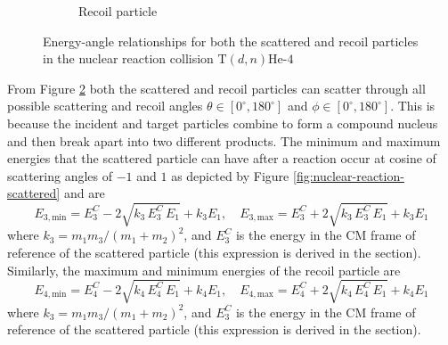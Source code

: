 \documentclass[../main.tex]{subfiles}
\begin{document}
\begin{figure}[!htb]
\begin{subfigure}{.5\textwidth}
    \caption{Recoil particle}
    \label{fig:nuclear-reaction-recoil}
  \end{subfigure}
  \caption{Energy-angle relationships for both the scattered and recoil particles in the nuclear reaction collision $\text{T}(d,n)\text{He-4}$}
  \label{fig:nuclear-reaction}
\end{figure}

From Figure \ref{fig:nuclear-reaction} both the scattered and recoil particles can scatter through all possible scattering and recoil angles $\theta \in [0^{\circ}, 180^{\circ}]$ and $\phi \in [0^{\circ}, 180^{\circ}]$. This is because the incident and target particles combine to form a compound nucleus and then break apart into two different products. The minimum and maximum energies that the scattered particle can have after a reaction occur at cosine of scattering angles of $-1$ and $1$ as depicted by Figure \ref{fig:nuclear-reaction-scattered} and are
\begin{equation}
  E_{3,\text{min}} = E_3^C - 2 \sqrt{k_3 \, E_3^C \, E_1} + k_3 E_1, \quad E_{3,\text{max}} = E_3^C + 2 \sqrt{k_3 \, E_3^C \, E_1} + k_3 E_1
\end{equation}
where $k_3 = m_1 m_3 / (m_1+m_2)^2$, and $E_3^C$ is the energy in the CM frame of reference of the scattered particle (this expression is derived in the section). Similarly, the maximum and minimum energies of the recoil particle are
\begin{equation}
  E_{4,\text{min}} = E_4^C - 2 \sqrt{k_4 \, E_4^C \, E_1} + k_4 E_1, \quad E_{4,\text{max}} = E_4^C + 2 \sqrt{k_4 \, E_4^C \, E_1} + k_4 E_1
\end{equation}
where $k_3 = m_1 m_3 / (m_1+m_2)^2$, and $E_3^C$ is the energy in the CM frame of reference of the scattered particle (this expression is derived in the section).
\end{document}
